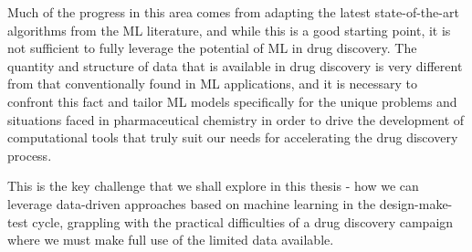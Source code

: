 Much of the progress in this area comes from adapting the latest state-of-the-art algorithms from the ML literature, and while this is a good starting point, it is not sufficient to fully leverage the potential of ML in drug discovery. The quantity and structure of data that is available in drug discovery is very different from that conventionally found in ML applications, and it is necessary to confront this fact and tailor ML models specifically for the unique problems and situations faced in pharmaceutical chemistry in order to drive the development of computational tools that truly suit our needs for accelerating the drug discovery process.

This is the key challenge that we shall explore in this thesis - how we can leverage data-driven approaches based on machine learning in the design-make-test cycle, grappling with the practical difficulties of a drug discovery campaign where we must make full use of the limited data available.




